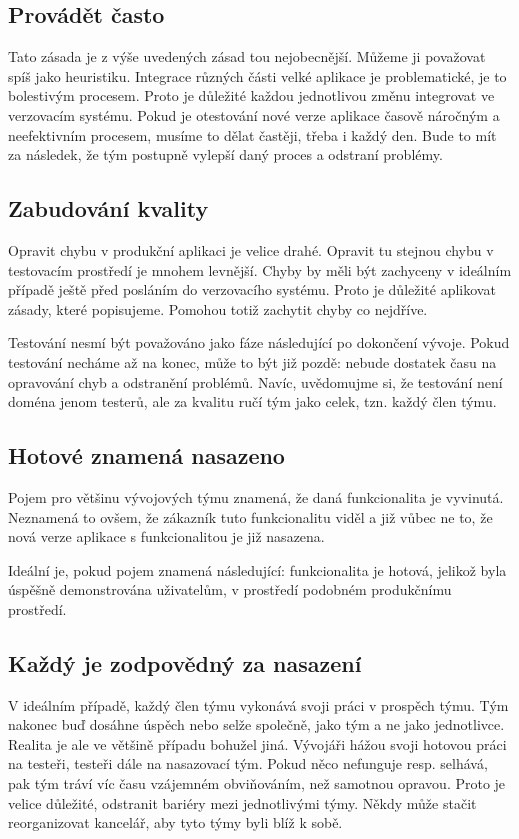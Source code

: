 \subsection{Provádět často}
Tato zásada je z výše uvedených zásad tou nejobecnější. Můžeme ji považovat spíš jako heuristiku. Integrace různých části velké aplikace je problematické, je to bolestivým procesem. Proto je důležité každou jednotlivou změnu integrovat ve verzovacím systému. Pokud je otestování nové verze aplikace časově náročným a neefektivním procesem, musíme to dělat častěji, třeba i každý den. Bude to mít za následek, že tým postupně vylepší daný proces a odstraní problémy.

\subsection{Zabudování kvality}
Opravit chybu v produkční aplikaci je velice drahé. Opravit tu stejnou chybu v testovacím prostředí je mnohem levnější. Chyby by měli být zachyceny v ideálním případě ještě před posláním do verzovacího systému. Proto je důležité aplikovat zásady, které popisujeme. Pomohou totiž zachytit chyby co nejdříve.

Testování nesmí být považováno jako fáze následující po dokončení vývoje. Pokud testování necháme až na konec, může to být již pozdě: nebude dostatek času na opravování chyb a odstranění problémů. Navíc, uvědomujme si, že testování není doména jenom testerů, ale za kvalitu ručí tým jako celek, tzn. každý člen týmu.

\subsection{Hotové znamená nasazeno}
Pojem  pro většinu vývojových týmu znamená, že daná funkcionalita je vyvinutá. Neznamená to ovšem, že zákazník tuto funkcionalitu viděl a již vůbec ne to, že nová verze aplikace s funkcionalitou je již nasazena. 

Ideální je, pokud pojem  znamená následující: funkcionalita je hotová, jelikož byla úspěšně demonstrována uživatelům, v prostředí podobném produkčnímu prostředí. 

\subsection{Každý je zodpovědný za nasazení}
V ideálním případě, každý člen týmu vykonává svoji práci v prospěch týmu. Tým nakonec buď dosáhne úspěch nebo selže společně, jako tým a ne jako jednotlivce. Realita je ale ve většině případu bohužel jiná. Vývojáři hážou svoji hotovou práci na testeři, testeři dále na nasazovací tým. Pokud něco nefunguje resp. selhává, pak tým tráví víc času vzájemném obviňováním, než samotnou opravou. Proto je velice důležité, odstranit bariéry mezi jednotlivými týmy. Někdy může stačit reorganizovat kancelář, aby tyto týmy byli blíž k sobě.

